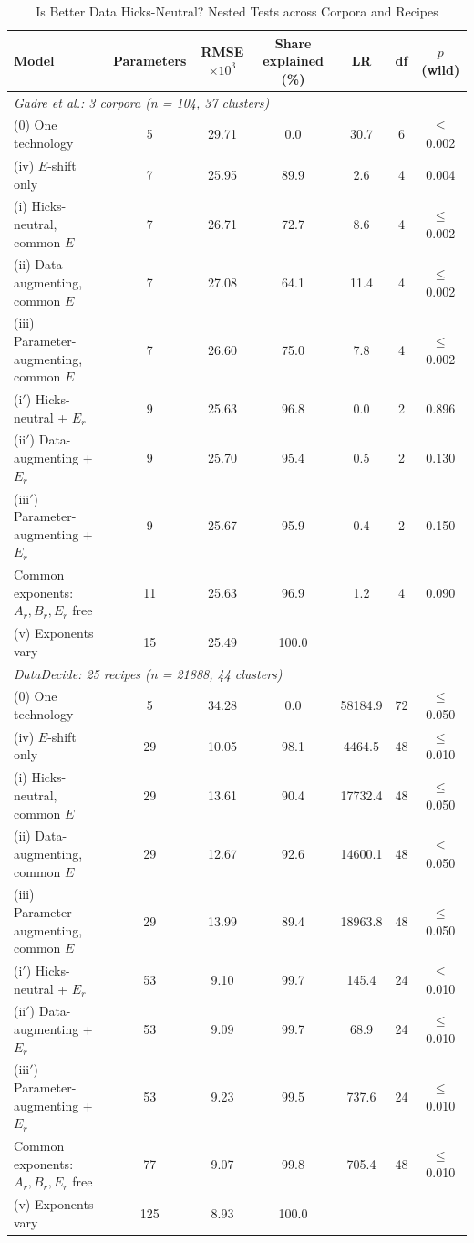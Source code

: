 \begin{table}[!htbp]
\centering
\footnotesize
\caption{Is Better Data Hicks-Neutral? Nested Tests across Corpora and Recipes}
\label{tab:neutrality}
\begin{threeparttable}
\begin{tabular}{lcccccc}
\toprule
Model & Parameters & RMSE $\times10^3$ & Share explained (\%) & LR & df & $p$ (wild) \\
\midrule
\multicolumn{7}{l}{\textit{Gadre et al.: 3 corpora (n = 104, 37 clusters)}} \\
(0) One technology & 5 & 29.71 & 0.0 & 30.7 & 6 & $\leq$0.002 \\
(iv) $E$-shift only & 7 & 25.95 & 89.9 & 2.6 & 4 & 0.004 \\
(i) Hicks-neutral, common $E$ & 7 & 26.71 & 72.7 & 8.6 & 4 & $\leq$0.002 \\
(ii) Data-augmenting, common $E$ & 7 & 27.08 & 64.1 & 11.4 & 4 & $\leq$0.002 \\
(iii) Parameter-augmenting, common $E$ & 7 & 26.60 & 75.0 & 7.8 & 4 & $\leq$0.002 \\
(i$'$) Hicks-neutral + $E_r$ & 9 & 25.63 & 96.8 & 0.0 & 2 & 0.896 \\
(ii$'$) Data-augmenting + $E_r$ & 9 & 25.70 & 95.4 & 0.5 & 2 & 0.130 \\
(iii$'$) Parameter-augmenting + $E_r$ & 9 & 25.67 & 95.9 & 0.4 & 2 & 0.150 \\
Common exponents: $A_r,B_r,E_r$ free & 11 & 25.63 & 96.9 & 1.2 & 4 & 0.090 \\
(v) Exponents vary & 15 & 25.49 & 100.0 &  &  &  \\
\midrule
\multicolumn{7}{l}{\textit{DataDecide: 25 recipes (n = 21888, 44 clusters)}} \\
(0) One technology & 5 & 34.28 & 0.0 & 58184.9 & 72 & $\leq$0.050 \\
(iv) $E$-shift only & 29 & 10.05 & 98.1 & 4464.5 & 48 & $\leq$0.010 \\
(i) Hicks-neutral, common $E$ & 29 & 13.61 & 90.4 & 17732.4 & 48 & $\leq$0.050 \\
(ii) Data-augmenting, common $E$ & 29 & 12.67 & 92.6 & 14600.1 & 48 & $\leq$0.050 \\
(iii) Parameter-augmenting, common $E$ & 29 & 13.99 & 89.4 & 18963.8 & 48 & $\leq$0.050 \\
(i$'$) Hicks-neutral + $E_r$ & 53 & 9.10 & 99.7 & 145.4 & 24 & $\leq$0.010 \\
(ii$'$) Data-augmenting + $E_r$ & 53 & 9.09 & 99.7 & 68.9 & 24 & $\leq$0.010 \\
(iii$'$) Parameter-augmenting + $E_r$ & 53 & 9.23 & 99.5 & 737.6 & 24 & $\leq$0.010 \\
Common exponents: $A_r,B_r,E_r$ free & 77 & 9.07 & 99.8 & 705.4 & 48 & $\leq$0.010 \\
(v) Exponents vary & 125 & 8.93 & 100.0 &  &  &  \\


\end{tabular}
\end{threeparttable}
\end{table}

